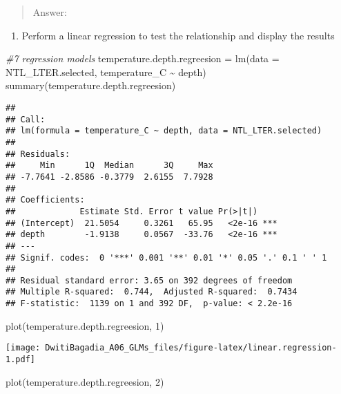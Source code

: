 \documentclass[
]{article}
\newenvironment{Shaded}{\begin{snugshade}}{\end{snugshade}}
\newcommand{\AttributeTok}[1]{\textcolor[rgb]{0.77,0.63,0.00}{#1}}
\newcommand{\CommentTok}[1]{\textcolor[rgb]{0.56,0.35,0.01}{\textit{#1}}}
\newcommand{\DecValTok}[1]{\textcolor[rgb]{0.00,0.00,0.81}{#1}}
\newcommand{\FunctionTok}[1]{\textcolor[rgb]{0.00,0.00,0.00}{#1}}
\newcommand{\NormalTok}[1]{#1}
\newcommand{\OtherTok}[1]{\textcolor[rgb]{0.56,0.35,0.01}{#1}}
\newcommand{\SpecialCharTok}[1]{\textcolor[rgb]{0.00,0.00,0.00}{#1}}
\providecommand{\tightlist}{%
  \setlength{\itemsep}{0pt}\setlength{\parskip}{0pt}}
\begin{document}
\begin{quote}
Answer:
\end{quote}

\begin{enumerate}
\def\labelenumi{\arabic{enumi}.}
\setcounter{enumi}{6}
\tightlist
\item
  Perform a linear regression to test the relationship and display the
  results
\end{enumerate}

\begin{Shaded}
\begin{Highlighting}[]
\CommentTok{\#7 regression models}
\NormalTok{temperature.depth.regreesion }\OtherTok{=} \FunctionTok{lm}\NormalTok{(}\AttributeTok{data =}\NormalTok{ NTL\_LTER.selected, temperature\_C }\SpecialCharTok{\textasciitilde{}}\NormalTok{ depth)}
\FunctionTok{summary}\NormalTok{(temperature.depth.regreesion)}
\end{Highlighting}
\end{Shaded}

\begin{verbatim}
## 
## Call:
## lm(formula = temperature_C ~ depth, data = NTL_LTER.selected)
## 
## Residuals:
##     Min      1Q  Median      3Q     Max 
## -7.7641 -2.8586 -0.3779  2.6155  7.7928 
## 
## Coefficients:
##             Estimate Std. Error t value Pr(>|t|)    
## (Intercept)  21.5054     0.3261   65.95   <2e-16 ***
## depth        -1.9138     0.0567  -33.76   <2e-16 ***
## ---
## Signif. codes:  0 '***' 0.001 '**' 0.01 '*' 0.05 '.' 0.1 ' ' 1
## 
## Residual standard error: 3.65 on 392 degrees of freedom
## Multiple R-squared:  0.744,  Adjusted R-squared:  0.7434 
## F-statistic:  1139 on 1 and 392 DF,  p-value: < 2.2e-16
\end{verbatim}

\begin{Shaded}
\begin{Highlighting}[]
\FunctionTok{plot}\NormalTok{(temperature.depth.regreesion, }\DecValTok{1}\NormalTok{)}
\end{Highlighting}
\end{Shaded}

\texttt{[image: DwitiBagadia\_A06\_GLMs\_files/figure-latex/linear.regression-1.pdf]}

\begin{Shaded}
\begin{Highlighting}[]
\FunctionTok{plot}\NormalTok{(temperature.depth.regreesion, }\DecValTok{2}\NormalTok{)}
\end{Highlighting}
\end{Shaded}
\end{document}
